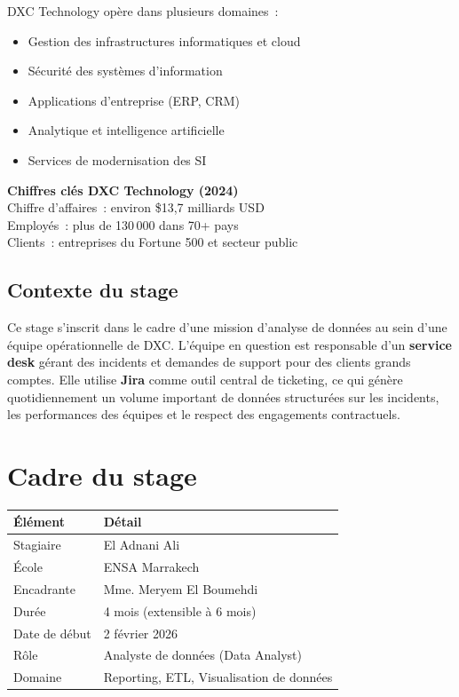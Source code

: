 \documentclass[12pt, a4paper]{report}
\begin{document}
DXC Technology opère dans plusieurs domaines~:
\begin{itemize}[leftmargin=2em]
    \item Gestion des infrastructures informatiques et cloud
    \item Sécurité des systèmes d'information
    \item Applications d'entreprise (ERP, CRM)
    \item Analytique et intelligence artificielle
    \item Services de modernisation des SI
\end{itemize}

\begin{infobox}
\textbf{Chiffres clés DXC Technology (2024)}\\
Chiffre d'affaires~: environ \$13,7 milliards USD\\
Employés~: plus de 130\,000 dans 70+ pays\\
Clients~: entreprises du Fortune 500 et secteur public
\end{infobox}

\subsection{Contexte du stage}

Ce stage s'inscrit dans le cadre d'une mission d'analyse de données au sein d'une équipe opérationnelle de DXC. L'équipe en question est responsable d'un \textbf{service desk} gérant des incidents et demandes de support pour des clients grands comptes. Elle utilise \textbf{Jira} comme outil central de ticketing, ce qui génère quotidiennement un volume important de données structurées sur les incidents, les performances des équipes et le respect des engagements contractuels.

\section{Cadre du stage}

\begin{tabular}{ll}
    \toprule
    \textbf{Élément} & \textbf{Détail} \\
    \midrule
    Stagiaire & El Adnani Ali \\
    École & ENSA Marrakech \\
    Encadrante & Mme. Meryem El Boumehdi \\
    Durée & 4 mois (extensible à 6 mois) \\
    Date de début & 2 février 2026 \\
    Rôle & Analyste de données (Data Analyst) \\
    Domaine & Reporting, ETL, Visualisation de données \\
    \bottomrule
\end{tabular}
\end{document}
